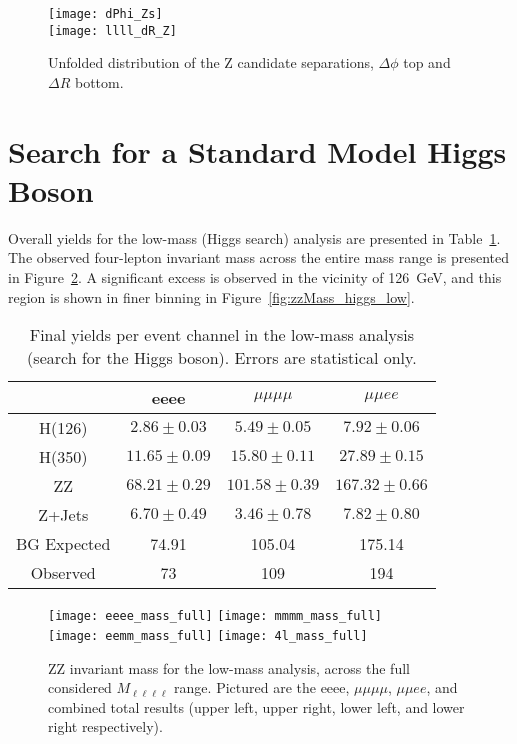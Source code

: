 \begin{figure}[h]
\centering
\texttt{[image: dPhi\_Zs]} \\ 
\texttt{[image: llll\_dR\_Z]}
\caption[Unfolded distribution of the Z candidate separation.]{Unfolded
distribution of the Z candidate separations, $\Delta \phi$ top and $\Delta R$
bottom.}
\label{fig:unfolding_Z_separation}
\end{figure}


\clearpage

\section{Search for a Standard Model Higgs Boson}
Overall yields for the low-mass (Higgs search) analysis are presented in
Table~\ref{tab:higgsYields}. The observed four-lepton invariant mass across the
entire mass range is presented in Figure~\ref{fig:zzMass_higgs_full}. A
significant excess is observed in the vicinity of 126~GeV, and this region is
shown in finer binning in Figure~\ref{fig:zzMass_higgs_low}.

\begin{table}[h]
\centering
\begin{tabular}{|c|c|c|c|}
\hline
& eeee & $\mu\mu\mu\mu$ & $\mu\mu e e$ \\
\hline
H(126) & $2.86\pm0.03$ & $5.49 \pm 0.05$ & $7.92 \pm 0.06$ \\
H(350) & $11.65 \pm 0.09 $ & $15.80\pm 0.11$ & $27.89 \pm 0.15$ \\
ZZ & $ 68.21 \pm 0.29 $ & $ 101.58 \pm 0.39 $ & $ 167.32 \pm 0.66 $ \\
Z+Jets & $6.70 \pm 0.49$ & $3.46 \pm 0.78$ & $7.82 \pm 0.80$ \\
\hline
BG Expected & 74.91 & 105.04 & 175.14 \\
\hline
Observed & 73 & 109 & 194 \\
\hline
\end{tabular}
\caption[Final yields per event channel in the low-mass analysis (search for the
Higgs boson).]{Final yields per event channel in the low-mass analysis (search for the
Higgs boson). Errors are statistical only.} 
\label{tab:higgsYields}
\end{table}

\begin{figure}[h]
\centering
\texttt{[image: eeee\_mass\_full]}
\texttt{[image: mmmm\_mass\_full]}\\
\texttt{[image: eemm\_mass\_full]}
\texttt{[image: 4l\_mass\_full]}
\caption[ZZ invariant mass for the low-mass analysis, across the full considered
$M_{\ell\ell\ell\ell}$ range.]{ZZ invariant mass for the low-mass analysis, across the full considered
$M_{\ell\ell\ell\ell}$ range. 
Pictured are the eeee, $\mu\mu\mu\mu$, $\mu\mu e
e$, and combined total results (upper left, upper right, lower left, and lower
right respectively).}
\label{fig:zzMass_higgs_full}
\end{figure}

